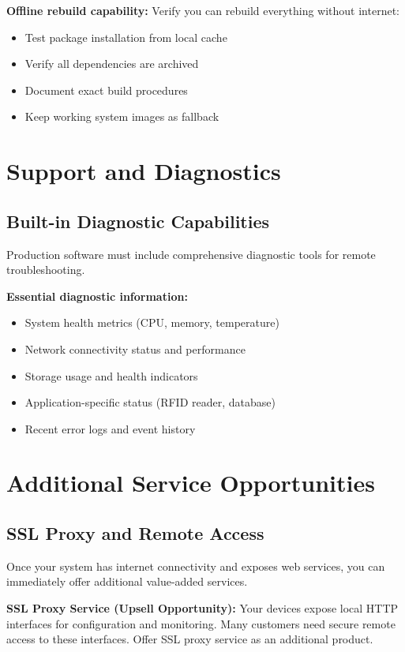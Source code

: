\textbf{Offline rebuild capability:}
Verify you can rebuild everything without internet:
\begin{itemize}
\item Test package installation from local cache
\item Verify all dependencies are archived
\item Document exact build procedures
\item Keep working system images as fallback
\end{itemize}

\section{Support and Diagnostics}

\subsection{Built-in Diagnostic Capabilities}

Production software must include comprehensive diagnostic tools for remote troubleshooting.

\textbf{Essential diagnostic information:}
\begin{itemize}
\item System health metrics (CPU, memory, temperature)
\item Network connectivity status and performance
\item Storage usage and health indicators
\item Application-specific status (RFID reader, database)
\item Recent error logs and event history
\end{itemize}

\section{Additional Service Opportunities}

\subsection{SSL Proxy and Remote Access}

Once your system has internet connectivity and exposes web services, you can immediately offer additional value-added services.

\textbf{SSL Proxy Service (Upsell Opportunity):}
Your devices expose local HTTP interfaces for configuration and monitoring. Many customers need secure remote access to these interfaces. Offer SSL proxy service as an additional product.

